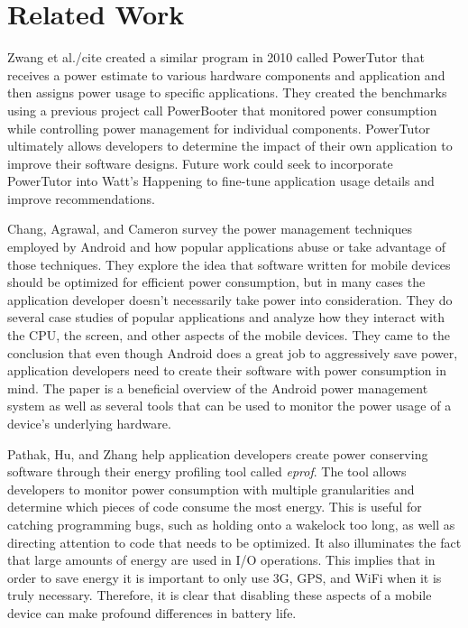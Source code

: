 \section*{Related Work}
Zwang et al./cite{} created a similar program in 2010 called PowerTutor that receives a power estimate to various hardware components and application and then assigns power usage to specific applications.  
They created the benchmarks using a previous project call PowerBooter that monitored power consumption while controlling power management for individual components.  
PowerTutor ultimately allows developers to determine the impact of their own application to improve their software designs.  
Future work could seek to incorporate PowerTutor into Watt's Happening to fine-tune application usage details and improve recommendations.

Chang, Agrawal, and Cameron survey the power management techniques employed by Android and how popular applications abuse or take advantage of those techniques\cite{energy-aware}. 
They explore the idea that software written for mobile devices should be optimized for efficient power consumption, but in many cases the application developer doesn't necessarily take power into consideration. 
They do several case studies of popular applications and analyze how they interact with the CPU, the screen, and other aspects of the mobile devices. 
They came to the conclusion that even though Android does a great job to aggressively save power, application developers need to create their software with power consumption in mind. 
The paper is a beneficial overview of the Android power management system as well as several tools that can be used to monitor the power usage of a device's underlying hardware. 

Pathak, Hu, and Zhang help application developers create power conserving software through their energy profiling tool called \emph{eprof}\cite{Pathak:2012:ESI:2168836.2168841}. 
The tool allows developers to monitor power consumption with multiple granularities and determine which pieces of code consume the most energy. 
This is useful for catching programming bugs, such as holding onto a wakelock too long, as well as directing attention to code that needs to be optimized. 
It also illuminates the fact that large amounts of energy are used in I/O operations. 
This implies that in order to save energy it is important to only use 3G, GPS, and WiFi when it is truly necessary. 
Therefore, it is clear that disabling these aspects of a mobile device can make profound differences in battery life.

